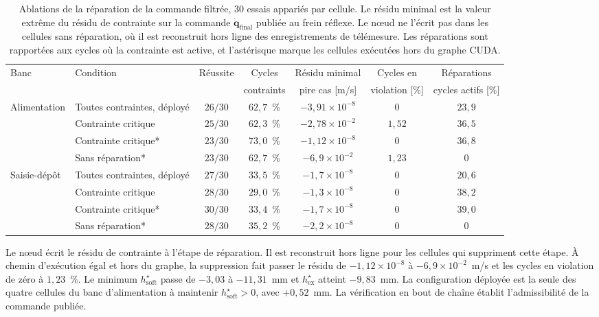 \begin{table}[htbp]
\centering
\caption[Ablations de la réparation de la commande filtrée]{Ablations de la réparation de la commande filtrée, $30$ essais appariés par cellule. Le résidu minimal est la valeur extrême du résidu de contrainte sur la commande $\dot{\mathbf{q}}_{\mathrm{final}}$ publiée au frein réflexe. Le n\oe ud ne l'écrit pas dans les cellules sans réparation, où il est reconstruit hors ligne des enregistrements de télémesure. Les réparations sont rapportées aux cycles où la contrainte est active, et l'astérisque marque les cellules exécutées hors du graphe \ac{CUDA}.}
\label{tab:res_abl_reparation}
\scriptsize
\setlength{\tabcolsep}{2.5pt}
\begin{tabular}{llccccc}
\toprule
Banc & Condition & Réussite & Cycles & Résidu minimal & Cycles en & Réparations \\
 & & & contraints & pire cas [m/s] & violation [\%] & cycles actifs [\%] \\
\midrule
Alimentation & Toutes contraintes, déployé & $26/30$ & $62{,}7$~\% & $-3{,}91\times10^{-8}$ & $0$ & $23{,}9$ \\
             & Contrainte critique          & $25/30$ & $62{,}3$~\% & $-2{,}78\times10^{-2}$ & $1{,}52$ & $36{,}5$ \\
             & Contrainte critique*         & $23/30$ & $73{,}0$~\% & $-1{,}12\times10^{-8}$ & $0$ & $36{,}8$ \\
             & Sans réparation*        & $23/30$ & $62{,}7$~\% & $-6{,}9\times10^{-2}$ & $1{,}23$ & $0$ \\
\addlinespace
Saisie-dépôt & Toutes contraintes, déployé & $27/30$ & $33{,}5$~\% & $-1{,}7\times10^{-8}$ & $0$ & $20{,}6$ \\
             & Contrainte critique          & $28/30$ & $29{,}0$~\% & $-1{,}3\times10^{-8}$ & $0$ & $38{,}2$ \\
             & Contrainte critique*         & $30/30$ & $33{,}4$~\% & $-1{,}7\times10^{-8}$ & $0$ & $39{,}0$ \\
             & Sans réparation*        & $28/30$ & $35{,}2$~\% & $-2{,}2\times10^{-8}$ & $0$ & $0$ \\
\bottomrule
\end{tabular}
\end{table}

Le n\oe ud écrit le résidu de contrainte à l'étape de réparation. Il est reconstruit hors ligne pour les cellules qui suppriment cette étape. À chemin d'exécution égal et hors du graphe, la suppression fait passer le résidu de $-1{,}12\times10^{-8}$ à $-6{,}9\times10^{-2}$~m/s et les cycles en violation de zéro à $1{,}23$~\%. Le minimum $h_{\mathrm{soft}}^{\star}$ passe de $-3{,}03$ à $-11{,}31$~mm et $h_{\mathrm{ex}}^{\star}$ atteint $-9{,}83$~mm. La configuration déployée est la seule des quatre cellules du banc d'alimentation à maintenir $h_{\mathrm{soft}}^{\star}>0$, avec $+0{,}52$~mm. La vérification en bout de chaîne établit l'admissibilité de la commande publiée.

